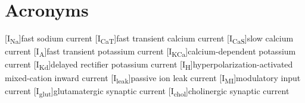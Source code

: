     \chapter*{Acronyms}
    \begin{acronym}[UMLX]
    	[I\textsubscript{Na}]{fast sodium current}
    	[I\textsubscript{CaT}]{fast transient calcium current}
    	[I\textsubscript{CaS}]{slow calcium current}
    	[I\textsubscript{A}]{fast transient potassium current}
    	[I\textsubscript{KCa}]{calcium-dependent potassium current}
    	[I\textsubscript{Kd}]{delayed rectifier potassium current}
    	[I\textsubscript{H}]{hyperpolarization-activated mixed-cation inward current}
    	[I\textsubscript{leak}]{passive ion leak current}
    	[I\textsubscript{MI}]{modulatory input current}
    	[I\textsubscript{glut}]{glutamatergic synaptic current}
    	[I\textsubscript{chol}]{cholinergic synaptic current}
    \end{acronym}

\endgroup
